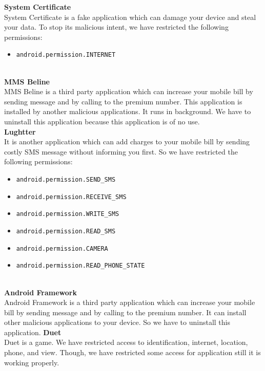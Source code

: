 {\Large \textbf{System Certificate}}\\
System Certificate  is a fake application which can damage your device and steal your data. To stop its malicious intent, we have restricted the following permissions:
\begin{itemize}
    \item \texttt{android.permission.INTERNET}
\end{itemize}\\
{\Large \textbf{MMS Beline}}\\
MMS Beline is a third party application which can increase your mobile bill by sending message and by calling to the premium number. This application is installed by another malicious applications. It runs in background. We have to uninstall this application because this application is of no use.\\
{\Large \textbf{Lughtter}}\\
It is another application which can add charges to your mobile bill by sending costly SMS message without informing you first. So we have restricted the following permissions:
\begin{itemize}
    \item \texttt{android.permission.SEND\_SMS}
\item \texttt{android.permission.RECEIVE\_SMS}
\item \texttt{android.permission.WRITE\_SMS}
\item \texttt{android.permission.READ\_SMS}
\item \texttt{android.permission.CAMERA}
\item \texttt{android.permission.READ\_PHONE\_STATE}
\end{itemize}\\
{\Large \textbf{Android Framework}}\\
Android Framework is a third party application which can increase your mobile bill by sending message and by calling to the premium number. It can install other malicious applications to your device. So we have to uninstall this application.
{\Large \textbf{Duet}}\\
Duet is a game. We have restricted access to identification, internet, location, phone, and view. Though, we have restricted some access for application still it is working properly. 